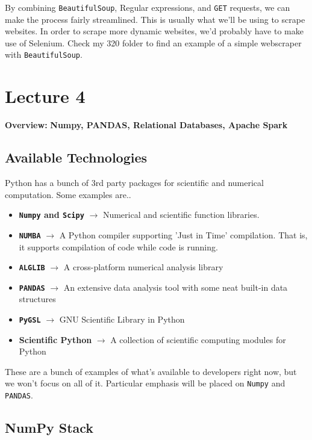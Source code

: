 \documentclass[english, 10pt]{article}
\begin{document}
By combining \texttt{BeautifulSoup}, Regular expressions, and \texttt{GET} requests, we can make the process fairly streamlined. This is usually what we'll be using to scrape websites. In order to scrape more dynamic websites, we'd probably have to make use of Selenium. Check my 320 folder to find an example of a simple webscraper with \texttt{BeautifulSoup}.

\section{Lecture 4}

\textbf{Overview:} \textbf{Numpy, PANDAS, Relational Databases, Apache Spark}\newline

\subsection{Available Technologies}

Python has a bunch of 3rd party packages for scientific and numerical computation. Some examples are..

\begin{itemize}
	\item \textbf{\texttt{Numpy} and \texttt{Scipy}} $\rightarrow$ Numerical and scientific function libraries.
	\item \textbf{\texttt{NUMBA}} $\rightarrow$ A Python compiler supporting 'Just in Time' compilation. That is, it supports compilation of code while code is running.
	\item \textbf{\texttt{ALGLIB}} $\rightarrow$ A cross-platform numerical analysis library
	\item \textbf{\texttt{PANDAS}} $\rightarrow$ An extensive data analysis tool with some neat built-in data structures
	\item \textbf{\texttt{PyGSL}} $\rightarrow$ GNU Scientific Library in Python
	\item \textbf{Scientific Python} $\rightarrow$ A collection of scientific computing modules for Python
\end{itemize}

These are a bunch of examples of what's available to developers right now, but we won't focus on all of it. Particular emphasis will be placed on \texttt{Numpy} and \texttt{PANDAS}.

\subsection{NumPy Stack}
\end{document}
